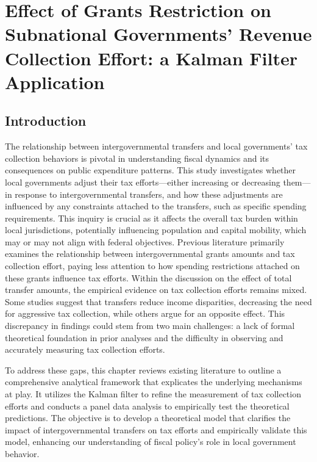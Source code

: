 
\chapter{Effect of Grants Restriction on Subnational Governments' Revenue Collection Effort: a Kalman Filter Application}

\section{Introduction}

The relationship between intergovernmental transfers and local governments' tax collection behaviors is pivotal in understanding fiscal dynamics and its consequences on public expenditure patterns. This study investigates whether local governments adjust their tax efforts—either increasing or decreasing them—in response to intergovernmental transfers, and how these adjustments are influenced by any constraints attached to the transfers, such as specific spending requirements. This inquiry is crucial as it affects the overall tax burden within local jurisdictions, potentially influencing population and capital mobility, which may or may not align with federal objectives.
Previous literature primarily examines the relationship between intergovernmental grants amounts and tax collection effort, paying less attention to how spending restrictions attached on these grants influence tax efforts. Within the discussion on the effect of total transfer amounts, the empirical evidence on tax collection efforts remains mixed. Some studies suggest that transfers reduce income disparities, decreasing the need for aggressive tax collection, while others argue for an opposite effect. This discrepancy in findings could stem from two main challenges: a lack of formal theoretical foundation in prior analyses and the difficulty in observing and accurately measuring tax collection efforts.

To address these gaps, this chapter reviews existing literature to outline a comprehensive analytical framework that explicates the underlying mechanisms at play. It utilizes the Kalman filter to refine the measurement of tax collection efforts and conducts a panel data analysis to empirically test the theoretical predictions. The objective is to develop a theoretical model that clarifies the impact of intergovernmental transfers on tax efforts and empirically validate this model, enhancing our understanding of fiscal policy's role in local government behavior.


